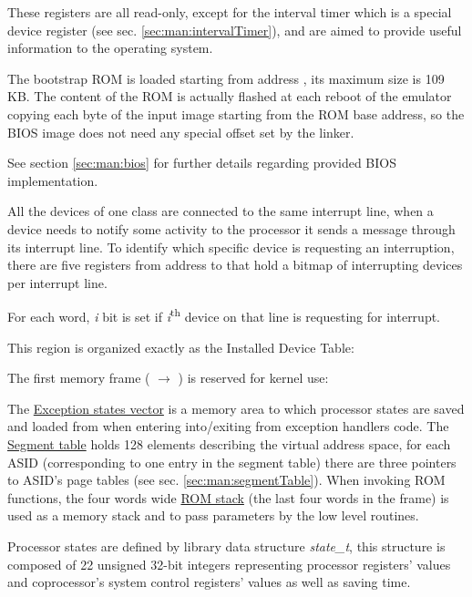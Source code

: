 
These registers are all read-only, except for the interval timer which is a special device register (see sec. \ref{sec:man:intervalTimer}), and are aimed to provide useful information to the operating system.

The bootstrap ROM is loaded starting from address , its maximum size is 109 KB.
The content of the ROM is actually flashed at each reboot of the emulator copying each byte of the input image starting from the ROM base address, so the BIOS image does not need any special offset set by the linker.

See section \ref{sec:man:bios} for further details regarding provided BIOS implementation.

All the devices of one class are connected to the same interrupt line, when a device needs to notify some activity to the processor it sends a message through its interrupt line.
To identify which specific device is requesting an interruption, there are five registers from address  to  that hold a bitmap of interrupting devices per interrupt line.

For each word, \emph{i} bit is set if \emph{i}\textsuperscript{th} device on that line is requesting for interrupt.

This region is organized exactly as the Installed Device Table:


\label{sec:man:kernelReservedFrame}
The first memory frame ( $\rightarrow$ ) is reserved for kernel use:


The \uline{Exception states vector} is a memory area to which processor states are saved and loaded from when entering into/exiting from exception handlers code.
The \uline{Segment table} holds 128 elements describing the virtual address space, for each ASID (corresponding to one entry in the segment table) there are three pointers to ASID's page tables (see sec. \ref{sec:man:segmentTable}).
When invoking ROM functions, the four words wide \uline{ROM stack} (the last four words in the frame) is used as a memory stack and to pass parameters by the low level routines.

Processor states are defined by library data structure \emph{state\_t}, this structure is composed of 22 unsigned 32-bit integers representing processor registers' values and coprocessor's system control registers' values as well as saving time. 

